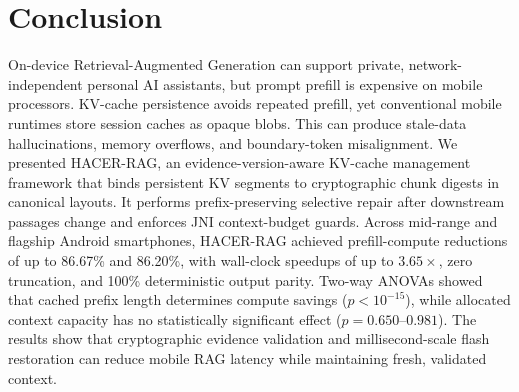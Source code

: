 \documentclass[10pt,conference]{IEEEtran}
\newcommand{\systemname}{HACER-RAG}
\begin{document}
\section{Conclusion}
\label{sec:conclusion}
On-device Retrieval-Augmented Generation can support private, network-independent personal AI assistants, but prompt prefill is expensive on mobile processors. KV-cache persistence avoids repeated prefill, yet conventional mobile runtimes store session caches as opaque blobs. This can produce stale-data hallucinations, memory overflows, and boundary-token misalignment. We presented \systemname{}, an evidence-version-aware KV-cache management framework that binds persistent KV segments to cryptographic chunk digests in canonical layouts. It performs prefix-preserving selective repair after downstream passages change and enforces JNI context-budget guards. Across mid-range and flagship Android smartphones, \systemname{} achieved prefill-compute reductions of up to 86.67\% and 86.20\%, with wall-clock speedups of up to $3.65\times$, zero truncation, and 100\% deterministic output parity. Two-way ANOVAs showed that cached prefix length determines compute savings ($p<10^{-15}$), while allocated context capacity has no statistically significant effect ($p=0.650\text{--}0.981$). The results show that cryptographic evidence validation and millisecond-scale flash restoration can reduce mobile RAG latency while maintaining fresh, validated context.
\end{document}
